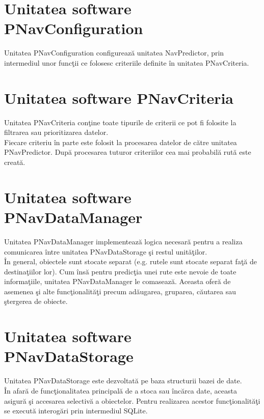 \section{Unitatea software PNavConfiguration} 
Unitatea PNavConfiguration configurează unitatea NavPredictor, prin intermediul unor funcţii ce folosesc criteriile definite în unitatea PNavCriteria.


\section{Unitatea software PNavCriteria} 
Unitatea PNavCriteria conţine toate tipurile de criterii ce pot fi folosite la filtrarea sau prioritizarea datelor.
\vspace{6pt}
\\Fiecare criteriu în parte este folosit la procesarea datelor de către unitatea PNavPredictor.
După procesarea tuturor criteriilor cea mai probabilă rută este creată.


\section{Unitatea software PNavDataManager} 
Unitatea PNavDataManager implementează logica necesară pentru a realiza comunicarea între unitatea PNavDataStorage şi restul unităţilor.
\vspace{6pt}
\\În general, obiectele sunt stocate separat (e.g. rutele sunt stocate separat faţă de destinaţiilor lor). Cum însă pentru predicţia unei rute este nevoie de toate informaţiile, unitatea PNavDataManager le comasează. Aceasta oferă de asemenea şi alte funcţionalităţi precum adăugarea, gruparea, căutarea sau ştergerea de obiecte.


\section{Unitatea software PNavDataStorage} 
Unitatea PNavDataStorage este dezvoltată pe baza structurii bazei de date.
\vspace{6pt}
\\În afară de funcţionalitatea principală de a stoca sau încărca date, aceasta asigură şi accesarea selectivă a obiectelor. Pentru realizarea acestor funcţionalităţi se execută interogări prin intermediul SQLite.
